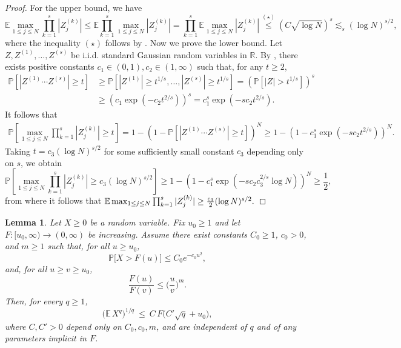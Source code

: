 \documentclass[numbers,webpdf,imaiai]{ima-authoring-template}
\theoremstyle{thmstyletwo}%
\newtheorem{lemma}[theorem]{Lemma}
\numberwithin{equation}{section}
\numberwithin{equation}{section}
\providecommand{\mathbbm}{\mathbb} %
\newcommand{\R}{\mathbbm{R}}
\newcommand{\E}{\mathbb{E}}
\begin{document}
\begin{appendix}
\begin{proof}
For the upper bound, we have
\[
\E  \max_{1\le j\le N} \prod_{k=1}^{s}|Z^{(k)}_j|\le \E \prod_{k=1}^{s}\max_{1\le j\le N} |Z^{(k)}_j|=\prod_{k=1}^{s}\E \max_{1\le j\le N}|Z^{(k)}_j|\overset{\text{$(\star)$}}{\le} \left(C\sqrt{\log N}\right)^{s}\lesssim_s (\log N)^{s/2},
\]
where the inequality $(\star)$ follows by \cite[Lemma 2.3.4]{talagrand2022upper}. Now we prove the lower bound. Let $Z, Z^{(1)},\ldots,Z^{(s)}$ be i.i.d. standard Gaussian random variables in $\R$. By \cite[Proposition 2.1.2]{vershynin2018high}, there exists positive constants $c_1\in (0,1),c_2\in (1,\infty)$ such that, for any $t\ge 2$,
\begin{align*}
\mathbb{P}\left[|Z^{(1)}\cdots Z^{(s)}|\ge t\right] &\ge  \mathbb{P}\left[ |Z^{(1)}|\ge t^{1/s},\ldots, |Z^{(s)}|\ge t^{1/s} \right]= \left(\mathbb{P}\left[|Z|>t^{1/s}\right]\right)^s\\
&\ge \left(c_1 \exp(-c_2 t^{2/s})\right)^s =c_1^s \exp\left(-sc_2 t^{2/s}\right). 
\end{align*}
It follows that
\begin{align*}
\mathbb{P}\left[ \max_{1\le j\le N} \prod_{k=1}^{s}|Z^{(k)}_j| \ge t \right] = 1- \left(1-\mathbb{P}\left[ |Z^{(1)}\cdots Z^{(s)}| \ge t\right]\right)^N\ge 1-\left(1-c_1^s \exp\left(-sc_2 t^{2/s} \right)\right)^N.
\end{align*}
Taking $t=c_3(\log N)^{s/2}$ for some sufficiently small constant $c_3$ depending only on $s$, we obtain
\[
\mathbb{P}\left[ \max_{1\le j\le N} \prod_{k=1}^{s}|Z^{(k)}_j| \ge c_3(\log N)^{s/2} \right]\ge 1-\left(1-c_1^s \exp\left(-sc_2 c_3^{2/s} \log N \right)\right)^N\ge \frac{1}{2},
\]
from where it follows that 
$
\E \max_{1\le j\le N} \prod_{k=1}^{s}|Z^{(k)}_j|\ge \frac{c_3}{2}(\log N)^{s/2}. \qedhere
$
\end{proof}


\begin{lemma}\label{lemma:tail_to_moment}
Let $X\ge 0$ be a random variable. Fix $u_0\ge 1$ and let $F:[u_0,\infty)\to (0,\infty)$ be increasing. Assume there exist constants
$C_0\ge 1$, $c_0>0$, and $m\ge 1$ such that, for all $u\ge u_0$,
\begin{equation}\label{eq:tail_assump}
\mathbb{P}\big[X>F(u)\big] \le C_0 e^{-c_0 u^2},
\end{equation}
and, for all $u\ge v\ge u_0$,
\begin{equation}\label{eq:growth_assump}
\frac{F(u)}{F(v)} \le \Big(\frac{u}{v}\Big)^m.
\end{equation}
Then, for every $q\ge 1$,
\begin{equation}\label{eq:moment_conclusion}
\big(\E \, X^q\big)^{1/q}\ \le\ C\,F\!\big(C'\sqrt{q}+u_0\big),
\end{equation}
where $C,C'>0$ depend only on $C_0,c_0,m$, and are independent of $q$ and of any parameters implicit in $F$.
\end{lemma}


\end{appendix}
\end{document}
